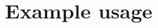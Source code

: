 \documentclass[paper.tex]{subfiles}
\begin{document}
\section{Example usage}
\label{sec:examples}
\end{document}
